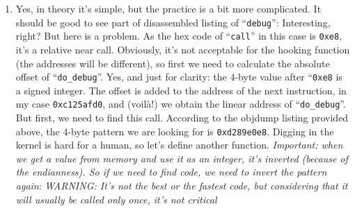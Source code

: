 \documentclass[12pt]{article}
\begin{document}
\begin{enumerate}
   \item Yes, in theory it's simple, but the practice is a bit more
     complicated. It should be good to see part of disassembled listing of
     ``\verb!debug!'':
      Interesting, right? But here is a problem. As the
     hex code of ``\verb!call!'' in this case is \verb!0xe8!, it's a relative
     near call. Obviously, it's not acceptable for the hooking function (the
     addresses will be different), so first we need to calculate the absolute
     offset of ``\verb!do_debug!''. Yes, and just for clarity: the 4-byte
     value after ``\verb!0xe8! is a signed integer. The offset is added to the
     address of the next instruction, in my case \verb!0xc125afd0!, and
     (voilà!) we obtain the linear address of ``\verb!do_debug!''. But first,
     we need to find this call. According to the objdump listing provided
     above, the 4-byte pattern we are looking for is
     \verb!0xd289e0e8!. Digging in the kernel is hard for a human, so let's
     define another function.  \emph{Important: when we get a value from
       memory and use it as an integer, it's inverted (because of the
       endianness). So if we need to find code, we need to invert the pattern
       again}:  \emph{WARNING: It's not the best or
       the fastest code, but considering that it will usually be called only
       once, it's not critical}
  \end{enumerate}
  
\end{document}
